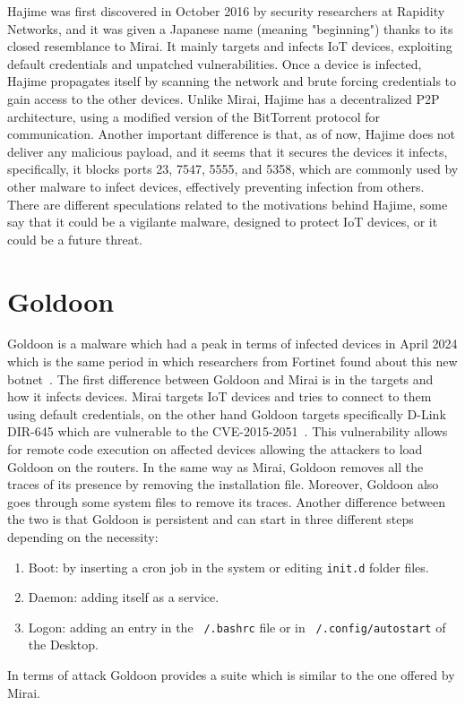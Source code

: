 Hajime was first discovered in October 2016 by security researchers at Rapidity Networks, and it was given a Japanese name (meaning "beginning") thanks to its closed resemblance to Mirai. It mainly targets and infects IoT devices, exploiting default credentials and unpatched vulnerabilities. Once a device is infected, Hajime propagates itself by scanning the network and brute forcing credentials to gain access to the other devices. Unlike Mirai, Hajime has a decentralized P2P architecture, using a modified version of the BitTorrent protocol for communication. Another important difference is that, as of now, Hajime does not deliver any malicious payload, and it seems that it secures the devices it infects, specifically, it blocks ports 23, 7547, 5555, and 5358, which are commonly used by other malware to infect devices, effectively preventing infection from others. There are different speculations related to the motivations behind Hajime, some say that it could be a vigilante malware, designed to protect IoT devices, or it could be a future threat.

\section{Goldoon}
Goldoon is a malware which had a peak in terms of infected devices in April 2024 which is the same period in which researchers from Fortinet found about this new botnet~\cite{fortinet-goldoon}. The first difference between Goldoon and Mirai is in the targets and how it infects devices. Mirai targets IoT devices and tries to connect to them using default credentials, on the other hand Goldoon targets specifically D-Link DIR-645 which are vulnerable to the CVE-2015-2051~\cite{CVE-2015-2051}. This vulnerability allows for remote code execution on affected devices allowing the attackers to load Goldoon on the routers. In the same way as Mirai, Goldoon removes all the traces of its presence by removing the installation file. Moreover, Goldoon also goes through some system files to remove its traces. Another difference between the two is that Goldoon is persistent and can start in three different steps depending on the necessity:
\begin{enumerate}
    \item Boot: by inserting a cron job in the system or editing \texttt{init.d} folder files.
    \item Daemon: adding itself as a service.
    \item Logon: adding an entry in the \texttt{~/.bashrc} file or in \texttt{~/.config/autostart} of the Desktop.
\end{enumerate}
In terms of attack Goldoon provides a suite which is similar to the one offered by Mirai.


